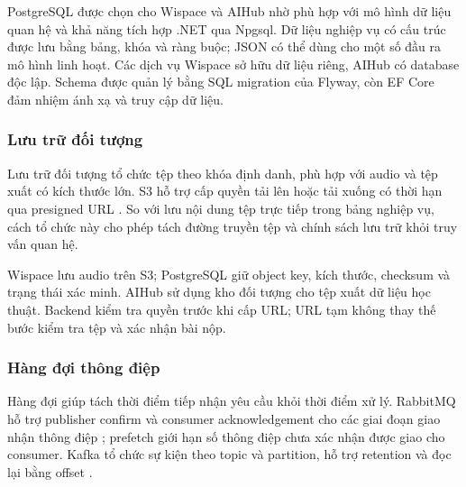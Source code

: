 PostgreSQL được chọn cho Wispace và AIHub nhờ phù hợp với mô hình dữ liệu quan hệ và khả năng tích hợp .NET qua Npgsql. Dữ liệu nghiệp vụ có cấu trúc được lưu bằng bảng, khóa và ràng buộc; JSON có thể dùng cho một số đầu ra mô hình linh hoạt. Các dịch vụ Wispace sở hữu dữ liệu riêng, AIHub có database độc lập. Schema được quản lý bằng SQL migration của Flyway, còn EF Core đảm nhiệm ánh xạ và truy cập dữ liệu.

\subsubsection{Lưu trữ đối tượng}

Lưu trữ đối tượng tổ chức tệp theo khóa định danh, phù hợp với audio và tệp xuất có kích thước lớn. S3 hỗ trợ cấp quyền tải lên hoặc tải xuống có thời hạn qua presigned URL \parencite{ch3_s3_presigned}. So với lưu nội dung tệp trực tiếp trong bảng nghiệp vụ, cách tổ chức này cho phép tách đường truyền tệp và chính sách lưu trữ khỏi truy vấn quan hệ.

Wispace lưu audio trên S3; PostgreSQL giữ object key, kích thước, checksum và trạng thái xác minh. AIHub sử dụng kho đối tượng cho tệp xuất dữ liệu học thuật. Backend kiểm tra quyền trước khi cấp URL; URL tạm không thay thế bước kiểm tra tệp và xác nhận bài nộp.

\subsubsection{Hàng đợi thông điệp}

Hàng đợi giúp tách thời điểm tiếp nhận yêu cầu khỏi thời điểm xử lý. RabbitMQ hỗ trợ publisher confirm và consumer acknowledgement cho các giai đoạn giao nhận thông điệp \parencite{ch4_rabbitmq_confirms}; prefetch giới hạn số thông điệp chưa xác nhận được giao cho consumer. Kafka tổ chức sự kiện theo topic và partition, hỗ trợ retention và đọc lại bằng offset \parencite{ch4_kafka_intro}.

